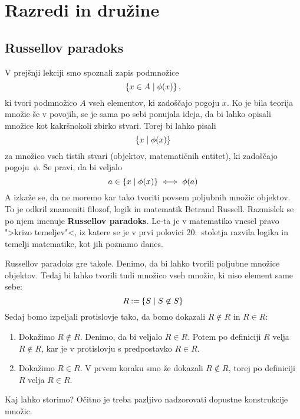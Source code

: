 \chapter{Razredi in družine}

\section{Russellov paradoks}

V prejšnji lekciji smo spoznali zapis podmnožice
%
\begin{equation*}
    \left\{ x \in A \; \middle| \; \phi(x) \right\},
\end{equation*}
%
ki tvori podmnožico $A$ vseh elementov, ki zadoščajo pogoju $x$. Ko je bila
teorija množic še v povojih, se je sama po sebi ponujala ideja, da bi lahko
opisali množice kot kakršnokoli zbirko stvari. Torej bi lahko pisali
%
\begin{equation*}
    \left\{ x \; \middle| \; \phi(x) \right\}
\end{equation*}
%
za množico vseh tistih stvari (objektov, matematičnih entitet), ki zadoščajo
pogoju~$\phi$. Se pravi, da bi veljalo
%
\begin{equation*}
    a \in \left\{ x \; \middle| \; \phi(x) \right\} \iff \phi(a)
\end{equation*}
%
A izkaže se, da ne moremo kar tako tvoriti povsem poljubnih množic objektov. To
je odkril znameniti filozof, logik in matematik Betrand Russell. Razmislek se po
njem imenuje \textbf{Russellov paradoks}. Le-ta je v matematiko vnesel pravo ">krizo
temeljev"<, iz katere se je v prvi polovici 20.~stoletja razvila logika in
temelji matematike, kot jih poznamo danes.

Russellov paradoks gre takole. Denimo, da bi lahko tvorili poljubne množice
objektov. Tedaj bi lahko tvorili tudi množico vseh množic, ki niso element same
sebe:
%
\begin{equation*}
    R \mathbin{{:}{=}} \left\{ S \; \middle| \; S \not\in S \right\}
\end{equation*}
%
Sedaj bomo izpeljali protislovje tako, da bomo dokazali $R \not\in R$ in $R \in R$:
%
\begin{enumerate}
\item Dokažimo $R \not\in R$.
  Denimo, da bi veljalo $R \in R$. Potem po definiciji $R$ velja $R \not\in R$, kar
  je v protislovju s predpostavko $R \in R$.

\item
  Dokažimo $R \in R$. V prvem koraku smo že dokazali $R \not\in R$, torej po
  definiciji $R$ velja $R \in R$.
\end{enumerate}
%
Kaj lahko storimo? Očitno je treba pazljivo nadzorovati dopustne konstrukcije
množic.


